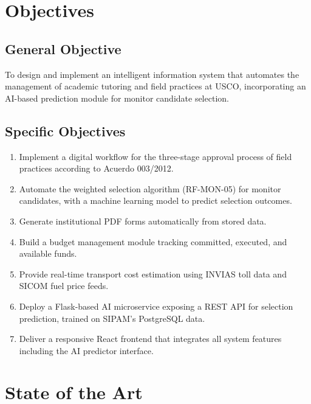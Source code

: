 \documentclass[12pt,a4paper]{article}
\begin{document}
\section{Objectives}

\subsection*{General Objective}
To design and implement an intelligent information system that automates the management of
academic tutoring and field practices at USCO, incorporating an AI-based prediction module for
monitor candidate selection.

\subsection*{Specific Objectives}
\begin{enumerate}
  \item Implement a digital workflow for the three-stage approval process of field practices
        according to Acuerdo 003/2012.
  \item Automate the weighted selection algorithm (RF-MON-05) for monitor candidates, with
        a machine learning model to predict selection outcomes.
  \item Generate institutional PDF forms automatically from stored data.
  \item Build a budget management module tracking committed, executed, and available funds.
  \item Provide real-time transport cost estimation using INVIAS toll data and SICOM fuel
        price feeds.
  \item Deploy a Flask-based AI microservice exposing a REST API for selection prediction,
        trained on SIPAM's PostgreSQL data.
  \item Deliver a responsive React frontend that integrates all system features including the
        AI predictor interface.
\end{enumerate}

\section{State of the Art}
\end{document}
